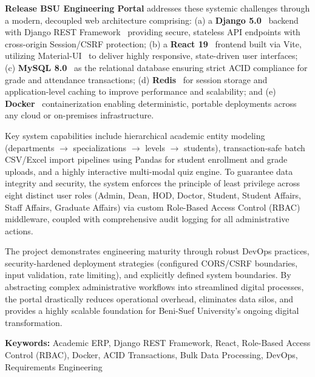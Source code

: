 \textbf{Release BSU Engineering Portal} addresses these systemic challenges through a modern, decoupled web architecture comprising: (a) a \textbf{Django 5.0}~\cite{django} backend with Django REST Framework~\cite{djangorest} providing secure, stateless API endpoints with cross-origin Session/CSRF protection; (b) a \textbf{React 19}~\cite{react} frontend built via Vite, utilizing Material-UI~\cite{mui} to deliver highly responsive, state-driven user interfaces; (c) \textbf{MySQL 8.0}~\cite{mysql} as the relational database ensuring strict ACID compliance for grade and attendance transactions; (d) \textbf{Redis}~\cite{redis} for session storage and application-level caching to improve performance and scalability; and (e) \textbf{Docker}~\cite{docker} containerization enabling deterministic, portable deployments across any cloud or on-premises infrastructure.

Key system capabilities include hierarchical academic entity modeling (departments $\rightarrow$ specializations $\rightarrow$ levels $\rightarrow$ students), transaction-safe batch CSV/Excel import pipelines using Pandas for student enrollment and grade uploads, and a highly interactive multi-modal quiz engine. To guarantee data integrity and security, the system enforces the principle of least privilege across eight distinct user roles (Admin, Dean, HOD, Doctor, Student, Student Affairs, Staff Affairs, Graduate Affairs) via custom Role-Based Access Control (RBAC) middleware, coupled with comprehensive audit logging for all administrative actions.

The project demonstrates engineering maturity through robust DevOps practices, security-hardened deployment strategies (configured CORS/CSRF boundaries, input validation, rate limiting), and explicitly defined system boundaries. By abstracting complex administrative workflows into streamlined digital processes, the portal drastically reduces operational overhead, eliminates data silos, and provides a highly scalable foundation for Beni-Suef University's ongoing digital transformation.

\vspace{1cm}
\noindent\textbf{Keywords:} Academic ERP, Django REST Framework, React, Role-Based Access Control (RBAC), Docker, ACID Transactions, Bulk Data Processing, DevOps, Requirements Engineering



